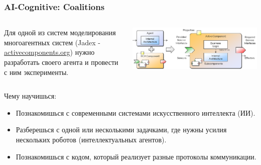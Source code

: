 \documentclass[default]{beamer}
\begin{document}
	\begin{frame}
		\frametitle{AI-Cognitive: Coalitions}
		
		\begin{columns}
			\begin{column}{0.5\textwidth}
				Для одной из систем моделирования многоагентных систем (Jadex - \url{activecomponents.org}) нужно разработать своего агента и провести с ним эксперименты.
			\end{column}
			\begin{column}{0.5\textwidth}
				\includegraphics[width=\textwidth]{misc/agents/ac.png}
			\end{column}
		\end{columns}
		\par\bigskip
		Чему научишься:
		\begin{itemize}
			\item Познакомишься с современными системами искусственного интеллекта (ИИ).
			\item Разберешься с одной или несколькими задачками, где нужны усилия нескольких роботов (интеллектуальных агентов).
			\item Познакомишься с кодом, который реализует разные протоколы коммуникации.
		\end{itemize}
	\end{frame}
\end{document}
